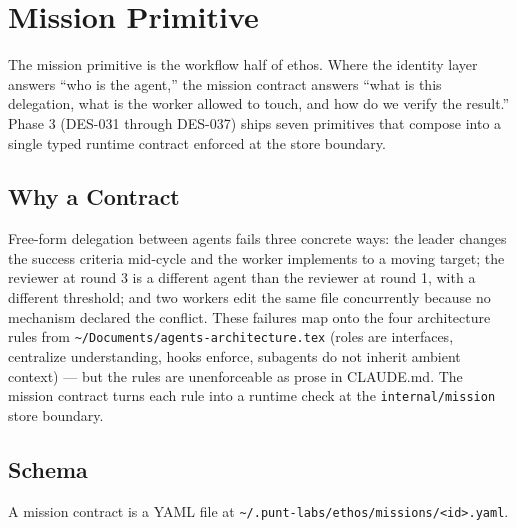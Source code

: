 \documentclass[a4paper,10pt]{article}
\newcommand{\pkg}[1]{\texttt{#1}}
\newcommand{\fpath}[1]{\texttt{#1}}
\begin{document}
\section{Mission Primitive}
\label{sec:mission}

The mission primitive is the workflow half of ethos.  Where the
identity layer answers ``who is the agent,'' the mission contract
answers ``what is this delegation, what is the worker allowed to
touch, and how do we verify the result.''  Phase 3 (DES-031 through
DES-037) ships seven primitives that compose into a single typed
runtime contract enforced at the store boundary.

\subsection{Why a Contract}

Free-form delegation between agents fails three concrete ways: the
leader changes the success criteria mid-cycle and the worker
implements to a moving target; the reviewer at round 3 is a
different agent than the reviewer at round 1, with a different
threshold; and two workers edit the same file concurrently because
no mechanism declared the conflict.  These failures map onto the
four architecture rules from
\texttt{\~{}/Documents/agents-architecture.tex} (roles are
interfaces, centralize understanding, hooks enforce, subagents do
not inherit ambient context) --- but the rules are unenforceable as
prose in CLAUDE.md.  The mission contract turns each rule into a
runtime check at the \pkg{internal/mission} store boundary.

\subsection{Schema}

A mission contract is a YAML file at
\fpath{\~{}/.punt-labs/ethos/missions/<id>.yaml}.
\end{document}
